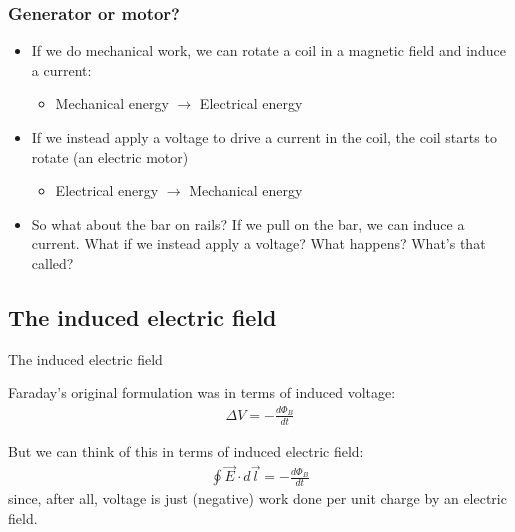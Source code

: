 \documentclass[aspectratio=169,
hyperref={colorlinks,urlcolor=blue}
]{beamer}
\begin{document}
\subsubsection{Generator or motor?}
\label{subsubsec:generatorormotor}
{
\begin{itemize}
\item If we do mechanical work, we can rotate a coil in a magnetic field and induce a current:
\begin{itemize}
\item Mechanical energy $\rightarrow$ Electrical energy
\end{itemize}
\item If we instead apply a voltage to drive a current in the coil, the coil starts to rotate (an electric motor)
\begin{itemize}
\item Electrical energy $\rightarrow$ Mechanical energy
\end{itemize}
\item So what about the bar on rails? If we pull on the bar, we can induce a current. What if we instead apply a voltage? What happens? What’s that called?
\end{itemize}
}
{
}


\subsection{The induced electric field}
\label{subsec:theinducedelectricfield}
\begin{bulletframe}{The induced electric field}
\item Faraday’s original formulation was in terms of induced voltage:
\begin{align*}
\Delta V = -\frac{d\Phi_B}{dt}
\end{align*}
\item But we can think of this in terms of induced electric field:
\begin{align*}
\oint \vec E\cdot d\vec l = -\frac{d\Phi_B}{dt}
\end{align*}
since, after all, voltage is just (negative) work done per unit charge by an electric field.
\end{bulletframe}
\end{document}
